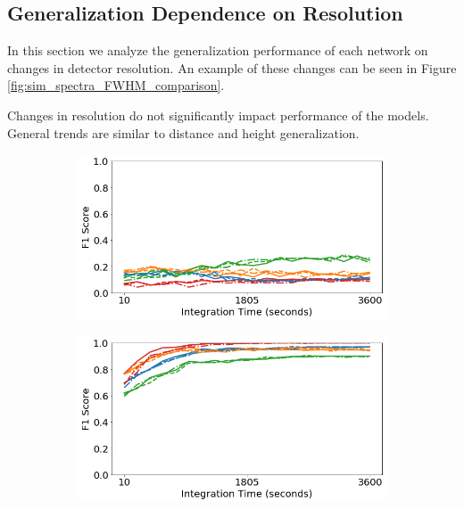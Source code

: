 \subsection{Generalization Dependence on Resolution}

In this section we analyze the generalization performance of each network on changes in detector resolution. An example of these changes can be seen in Figure \ref{fig:sim_spectra_FWHM_comparison}.

Changes in resolution do not significantly impact performance of the models. General trends are similar to distance and height generalization.


\begin{figure}[H]
     \centering
     \begin{subfigure}[b]{0.49\textwidth}
         \centering
         \includegraphics[width=\textwidth]{images/generalization-fwhm-easy-01.png}
         \caption{}
         \label{fig:generalization-fwhm-easy-01}
     \end{subfigure}
     \hfill
     \begin{subfigure}[b]{0.49\textwidth}
         \centering
         \includegraphics[width=\textwidth]{images/generalization-fwhm-easy-05.png}
         \caption{}
         \label{fig:generalization-fwhm-easy-05}
     \end{subfigure}


\end{figure}
